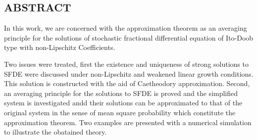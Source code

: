\documentclass[a4 paper, 12pt]{report}
\theoremstyle{plain}
\begin{document}

\newpage
\begin{center}
	\section*{ABSTRACT}
\end{center}
\noindent
\par In this work, we are concerned with the approximation theorem as an averaging principle for the solutions of stochastic fractional differential equation of Ito-Doob type with non-Lipschitz Coefficients.\\
\par Two issues were treated, first the existence and uniqueness of strong solutions to SFDE were discussed under non-Lipschitz and weakened linear growth conditions. This solution is constructed with the aid of Caetheodory approximation. Second, an averaging principle for the solutions to SFDE is proved and the simplified system is investigated andd their solutions can be approximated to that of the original system in the sense of mean square probability which constitute the approximation theorem. Two examples are presented with a numerical simulation to illustrate the obatained theory.%
\end{document}
